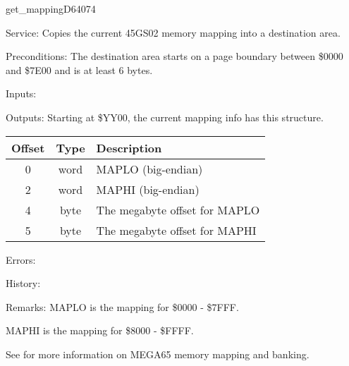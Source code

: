 \newpage
\begin{hyppotrap}{get\_mapping}{D640}{74}
\item [Service:]
  Copies the current 45GS02 memory mapping into a destination area.
\item [Preconditions:]
  The destination area starts on a page boundary between \$0000 and \$7E00 and
  is at least 6 bytes.
\item [Inputs:]
\item [Outputs:]
  Starting at \$YY00, the current mapping info has this structure.
  {\setlength{\tabcolsep}{2mm}
  \begin{tabular}{|c|c|p{6.9cm}|}
  \hline
  \textbf{Offset} & \textbf{Type} & \textbf{Description} \\
  \hline
  0 & word & MAPLO (big-endian) \\
  2 & word & MAPHI (big-endian) \\
  4 & byte & The megabyte offset for MAPLO \\
  5 & byte & The megabyte offset for MAPHI \\
  \hline
  \end{tabular}
  }
\item [Errors:]
\item [History:]
\item [Remarks:]
  MAPLO is the mapping for \$0000 - \$7FFF.

  MAPHI is the mapping for \$8000 - \$FFFF.

  See  for more information on MEGA65 memory mapping and
  banking.
\end{hyppotrap}


